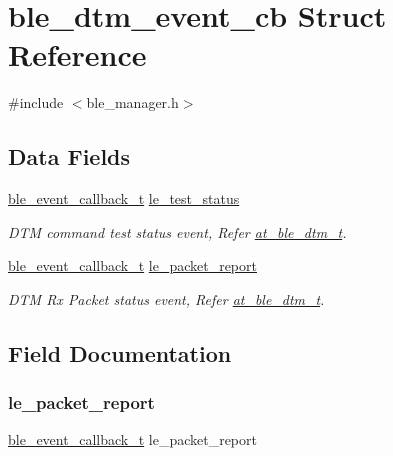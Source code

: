 \hypertarget{structble__dtm__event__cb}{}\section{ble\+\_\+dtm\+\_\+event\+\_\+cb Struct Reference}
\label{structble__dtm__event__cb}


{\ttfamily \#include $<$ble\+\_\+manager.\+h$>$}

\subsection*{Data Fields}
\begin{DoxyCompactItemize}
\item 
\mbox{\hyperlink{ble__manager_8h_a04ce4bb8cb8282f2762e3924b1773cc9}{ble\+\_\+event\+\_\+callback\+\_\+t}} \mbox{\hyperlink{structble__dtm__event__cb_a4fe7435087a5a73690994a8ced7b241f}{le\+\_\+test\+\_\+status}}
\begin{DoxyCompactList}\small\item\em D\+TM command test status event, Refer \mbox{\hyperlink{structat__ble__dtm__t}{at\+\_\+ble\+\_\+dtm\+\_\+t}}. \end{DoxyCompactList}\item 
\mbox{\hyperlink{ble__manager_8h_a04ce4bb8cb8282f2762e3924b1773cc9}{ble\+\_\+event\+\_\+callback\+\_\+t}} \mbox{\hyperlink{structble__dtm__event__cb_a96f9e9854e6d920de7ff6066cb78971d}{le\+\_\+packet\+\_\+report}}
\begin{DoxyCompactList}\small\item\em D\+TM Rx Packet status event, Refer \mbox{\hyperlink{structat__ble__dtm__t}{at\+\_\+ble\+\_\+dtm\+\_\+t}}. \end{DoxyCompactList}\end{DoxyCompactItemize}


\subsection{Field Documentation}
\mbox{\label{structble__dtm__event__cb_a96f9e9854e6d920de7ff6066cb78971d}} 
\subsubsection{\texorpdfstring{le\_packet\_report}{le\_packet\_report}}
{\footnotesize\ttfamily \mbox{\hyperlink{ble__manager_8h_a04ce4bb8cb8282f2762e3924b1773cc9}{ble\+\_\+event\+\_\+callback\+\_\+t}} le\+\_\+packet\+\_\+report}



